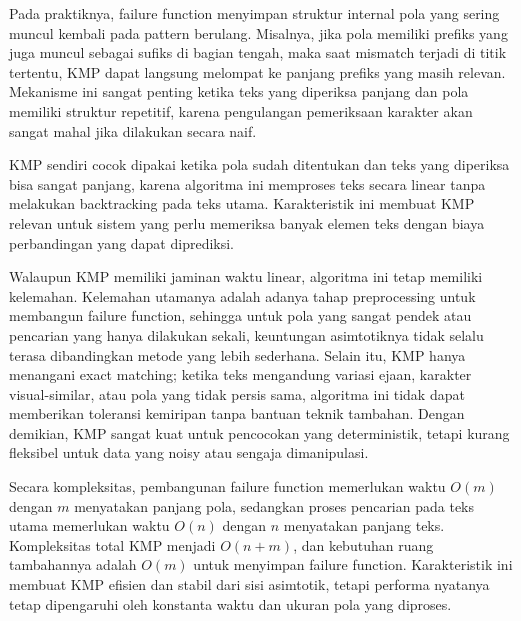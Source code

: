 Pada praktiknya, failure function menyimpan struktur internal pola yang sering muncul kembali pada pattern berulang. Misalnya, jika pola memiliki prefiks yang juga muncul sebagai sufiks di bagian tengah, maka saat mismatch terjadi di titik tertentu, KMP dapat langsung melompat ke panjang prefiks yang masih relevan. Mekanisme ini sangat penting ketika teks yang diperiksa panjang dan pola memiliki struktur repetitif, karena pengulangan pemeriksaan karakter akan sangat mahal jika dilakukan secara naif.

KMP sendiri cocok dipakai ketika pola sudah ditentukan dan teks yang diperiksa bisa sangat panjang, karena algoritma ini memproses teks secara linear tanpa melakukan backtracking pada teks utama. Karakteristik ini membuat KMP relevan untuk sistem yang perlu memeriksa banyak elemen teks dengan biaya perbandingan yang dapat diprediksi.

Walaupun KMP memiliki jaminan waktu linear, algoritma ini tetap memiliki kelemahan. Kelemahan utamanya adalah adanya tahap preprocessing untuk membangun failure function, sehingga untuk pola yang sangat pendek atau pencarian yang hanya dilakukan sekali, keuntungan asimtotiknya tidak selalu terasa dibandingkan metode yang lebih sederhana. Selain itu, KMP hanya menangani exact matching; ketika teks mengandung variasi ejaan, karakter visual-similar, atau pola yang tidak persis sama, algoritma ini tidak dapat memberikan toleransi kemiripan tanpa bantuan teknik tambahan. Dengan demikian, KMP sangat kuat untuk pencocokan yang deterministik, tetapi kurang fleksibel untuk data yang noisy atau sengaja dimanipulasi.

Secara kompleksitas, pembangunan failure function memerlukan waktu $O(m)$ dengan $m$ menyatakan panjang pola, sedangkan proses pencarian pada teks utama memerlukan waktu $O(n)$ dengan $n$ menyatakan panjang teks. Kompleksitas total KMP menjadi $O(n + m)$, dan kebutuhan ruang tambahannya adalah $O(m)$ untuk menyimpan failure function. Karakteristik ini membuat KMP efisien dan stabil dari sisi asimtotik, tetapi performa nyatanya tetap dipengaruhi oleh konstanta waktu dan ukuran pola yang diproses.

